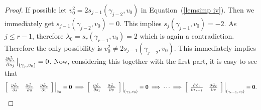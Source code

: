 \documentclass[10pt,twoside]{amsart}
\theoremstyle{definition}
\theoremstyle{definition}
\begin{document}
\begin{proof}
If possible let $v_0^2=2s_{j-1}(\gamma_{j-2},v_0)$ in Equation~(\ref{lemsimp iv}). Then we immediately get $s_{j-1}(\gamma_{j-2},v_0)=0$. This implies $s_j(\gamma_{j-1},v_0)=-2$. As $j\leq r-1$, therefore $\lambda_0=s_r(\gamma_{r-1},v_0)=2$ which is again a contradiction. Therefore the only possibility is $v_0^2\neq 2s_{j-1}(\gamma_{j-2},v_0)$. This immediately implies $\frac{\partial\Tilde{\psi}_r}{\partial s_{j}}\big |_{(\gamma_j,v_0)}=0$. Now, considering this together with the first part, it is easy to see that 
\begin{eqnarray*}
\left[\begin{array}{ccc}
\frac{\partial\Tilde{\psi}_r}{\partial s} & \frac{\partial\Tilde{\psi}_r}{\partial u} & \frac{\partial\Tilde{\psi}_r}{\partial v}  \end{array}\right]\Big |_{\beta_0}=\mathbf{0}\implies \left[\begin{array}{ccc}\frac{\partial\Tilde{\psi}_r}{\partial s_1} & \frac{\partial\Tilde{\psi}_r}{\partial v}  \end{array}\right]\Big |_{(\gamma_1,v_0)}=\mathbf{0} \implies\cdots\implies \left[\begin{array}{ccc}
\frac{\partial\Tilde{\psi}_r}{\partial s_{r-1}} & \frac{\partial\Tilde{\psi}_r}{\partial v}  \end{array}\right]\Big |_{(\gamma_{r-1},v_0)}=\mathbf{0}.
\end{eqnarray*}


\end{proof}
\end{document}
